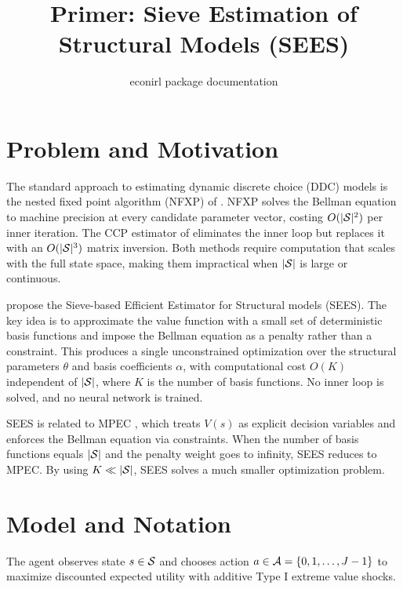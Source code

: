 \documentclass[11pt]{article}
\title{Primer: Sieve Estimation of Structural Models (SEES)}
\author{econirl package documentation}
\date{}
\begin{document}
\maketitle


\section{Problem and Motivation}

The standard approach to estimating dynamic discrete choice (DDC) models is the nested fixed point algorithm (NFXP) of \citet{rust1987}. NFXP solves the Bellman equation to machine precision at every candidate parameter vector, costing $O(|\mathcal{S}|^2)$ per inner iteration. The CCP estimator of \citet{hotzMiller1993} eliminates the inner loop but replaces it with an $O(|\mathcal{S}|^3)$ matrix inversion. Both methods require computation that scales with the full state space, making them impractical when $|\mathcal{S}|$ is large or continuous.

\citet{luoSang2024} propose the Sieve-based Efficient Estimator for Structural models (SEES). The key idea is to approximate the value function with a small set of deterministic basis functions and impose the Bellman equation as a penalty rather than a constraint. This produces a single unconstrained optimization over the structural parameters $\theta$ and basis coefficients $\alpha$, with computational cost $O(K)$ independent of $|\mathcal{S}|$, where $K$ is the number of basis functions. No inner loop is solved, and no neural network is trained.

SEES is related to MPEC \citep{suJudd2012}, which treats $V(s)$ as explicit decision variables and enforces the Bellman equation via constraints. When the number of basis functions equals $|\mathcal{S}|$ and the penalty weight goes to infinity, SEES reduces to MPEC. By using $K \ll |\mathcal{S}|$, SEES solves a much smaller optimization problem.


\section{Model and Notation}

\commonnotation

The agent observes state $s \in \mathcal{S}$ and chooses action $a \in \mathcal{A} = \{0, 1, \ldots, J-1\}$ to maximize discounted expected utility with additive Type I extreme value shocks.
\end{document}
